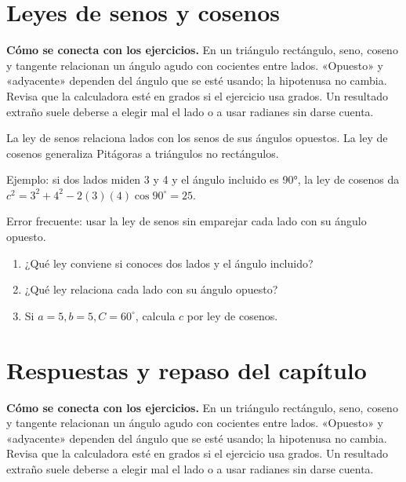 \documentclass[10pt,oneside,openany]{book}
\begin{document}
\section{Leyes de senos y cosenos}

\textbf{Cómo se conecta con los ejercicios.} En un triángulo rectángulo, seno, coseno y tangente relacionan un ángulo agudo con cocientes entre lados. «Opuesto» y «adyacente» dependen del ángulo que se esté usando; la hipotenusa no cambia. Revisa que la calculadora esté en grados si el ejercicio usa grados. Un resultado extraño suele deberse a elegir mal el lado o a usar radianes sin darse cuenta.

La ley de senos relaciona lados con los senos de sus ángulos opuestos. La ley de cosenos generaliza Pitágoras a triángulos no rectángulos.

\begin{ejemplo}
Ejemplo: si dos lados miden 3 y 4 y el ángulo incluido es 90°, la ley de cosenos da $c^2=3^2+4^2-2(3)(4)\cos90^\circ=25$.
\end{ejemplo}

\begin{ojo}
Error frecuente: usar la ley de senos sin emparejar cada lado con su ángulo opuesto.
\end{ojo}

\begin{practica}

\begin{enumerate}

\item ¿Qué ley conviene si conoces dos lados y el ángulo incluido?

\item ¿Qué ley relaciona cada lado con su ángulo opuesto?

\item Si $a=5,b=5,C=60^\circ$, calcula $c$ por ley de cosenos.

\end{enumerate}

\end{practica}



\section{Respuestas y repaso del capítulo}

\textbf{Cómo se conecta con los ejercicios.} En un triángulo rectángulo, seno, coseno y tangente relacionan un ángulo agudo con cocientes entre lados. «Opuesto» y «adyacente» dependen del ángulo que se esté usando; la hipotenusa no cambia. Revisa que la calculadora esté en grados si el ejercicio usa grados. Un resultado extraño suele deberse a elegir mal el lado o a usar radianes sin darse cuenta.
\end{document}
